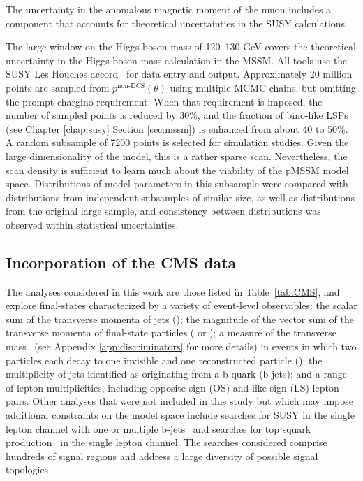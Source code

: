 The uncertainty in the anomalous magnetic moment of the muon includes a component that accounts for theoretical uncertainties in the SUSY calculations.

The large window on the Higgs boson mass of 120--130 GeV covers the theoretical uncertainty in the Higgs boson
mass calculation in the MSSM. All tools use the SUSY Les Houches accord~\cite{Skands:2003cj} for
data entry and output.  Approximately 20 million points are sampled from $p^\textrm{non-DCS}(\theta)$ using multiple MCMC chains, but omitting the prompt chargino requirement. When that requirement is imposed, the number of sampled points is reduced by 30\%, and the fraction of bino-like LSPs (see Chapter \ref{chap:susy} Section \ref{sec:mssm}) is enhanced from about 40 to 50\%. A random subsample of 7200 points is selected for simulation studies. Given the large dimensionality of the model, this is a rather sparse scan. Nevertheless, the scan density is sufficient to learn much about the viability of the pMSSM model space. Distributions of model parameters in this subsample were compared with distributions from independent subsamples of similar size, as well as distributions from the original large sample, and consistency between distributions was observed within statistical uncertainties. 




\subsection{Incorporation of the CMS data}
\label{sec:cmslhd}
The analyses considered in this work are those listed in Table~\ref{tab:CMS}, and explore final-states 
characterized by a variety of event-level observables:
the scalar sum of the transverse momenta of jets (\HT{}); the magnitude of the vector sum of 
the transverse momenta of final-state particles (\MET{} or \MHT{}); a measure of the transverse
mass~\cite{Lester:1999tx} (see Appendix \ref{app:discriminators} for more details) in events in which two particles each decay to one invisible and one reconstructed particle (\MTtwo{}); the multiplicity of jets identified as originating from a b quark (b-jets); and a
range of lepton multiplicities, including opposite-sign (OS) and
like-sign (LS) lepton pairs.  Other analyses that were not included in this study but which may impose additional constraints on the model space include  searches for SUSY in the single lepton channel with one or multiple b-jets~\cite{Chatrchyan:2013iqa} and searches for top squark production~\cite{Chatrchyan:2013xna} in the single lepton channel. The searches considered comprise hundreds of signal regions and address a large diversity of possible signal topologies.

